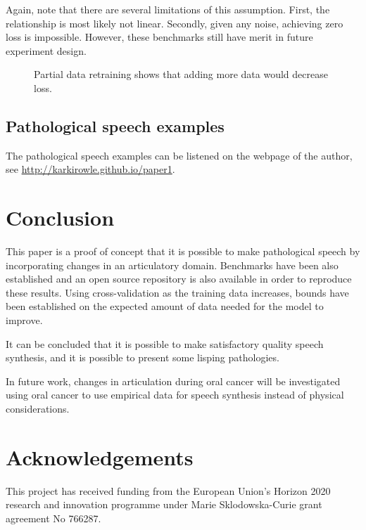 \documentclass[a4paper]{article}
\begin{document}
Again, note that there are several limitations of this assumption. First, the
relationship is most likely not linear. Secondly, given any noise, achieving
zero loss is impossible. However, these benchmarks still have merit in
future experiment design.

\begin{figure}[t]
  \begin{center}
    \scalebox{0.50}{}
    \caption{Partial data retraining shows that adding more data would
      decrease loss. }
    \label{retraining_linear}
\end{center}
\end{figure}


\subsection{Pathological speech examples}

The pathological speech examples can be listened on the webpage of the
author, see \url{http://karkirowle.github.io/paper1}. 

\section{Conclusion}

This paper is a proof of concept that it is possible to make pathological
speech by incorporating changes in an articulatory domain. Benchmarks
have been also established and an open source repository is also available
in order to reproduce these results. Using cross-validation as the
training data increases, bounds have been established on the expected
amount of data needed for the model to improve.

It can be concluded that it is possible to make satisfactory quality
speech synthesis, and it is possible to present some lisping pathologies.

In future work, changes in articulation during oral cancer will be
investigated using oral cancer to use empirical data for speech synthesis
instead of physical considerations.

\section{Acknowledgements}
This project has received funding from the European Union's Horizon
2020 research and innovation programme under Marie Sklodowska-Curie
grant agreement No 766287.






\end{document}
